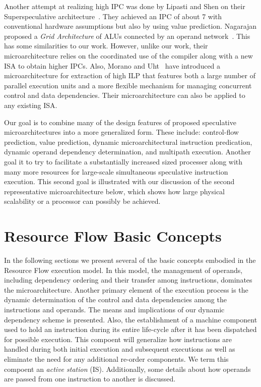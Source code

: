 \documentclass{book}
\begin{document}
Another attempt at realizing high IPC was done by
Lipasti and Shen on their Superspeculative
architecture~\cite{Lip97}.  They achieved an IPC of
about 7 with conventional hardware assumptions but
also by using value prediction.
Nagarajan proposed a {\em Grid Architecture} of ALUs
connected by an operand network~\cite{Nag01}.  
This has some similarities to our work.
However, unlike our work, their microarchitecture
relies on the coordinated use of the compiler along with
a new ISA to obtain higher IPCs.
Also, Morano and Uht~\cite{morano02high,uht02realizing}
have introduced a microarchitecture for extraction of
high ILP that features both
a large number of parallel execution units and a more flexible
mechanism for managing concurrent control and data dependencies.
Their microarchitecture can also be applied to any existing ISA.

Our goal is to combine many of the design features of
proposed speculative microarchitectures into a more 
generalized form.
These include: control-flow prediction, value prediction,
dynamic microarchitectural instruction predication, dynamic
operand dependency determination, and
multipath execution.
Another goal it to try to facilitate a substantially
increased sized processer along with many more 
resources for large-scale simultaneous speculative
instruction execution.
This second goal is illustrated with our discussion of
the second representative microarchitecture below, which
shows how large physical scalability or a processor can
possibly be achieved.
%
%
\section{Resource Flow Basic Concepts}
%
In the following sections we present several of the
basic concepts embodied in the Resource Flow execution model.
In this model, the management of operands, including
dependency ordering and their transfer among instructions, dominates
the microarchitecture.
Another primary element of the execution process is the
dynamic determination of the control and data dependencies
among the instructions and operands.
The means and implications of our dynamic dependency 
scheme is presented.
Also, the establishment of a machine component
used 
to hold an instruction during its entire life-cycle after it
has been dispatched for possible execution.
This compoent will generalize how instructions are handled
during both initial execution and subsequent executions as well
as eliminate the need for any additional re-order components.
We term this compoent an \textit{active station} (IS).
Additionally, some details about how operands are passed 
from one instruction to
another is discussed.
%
%
\end{document}
